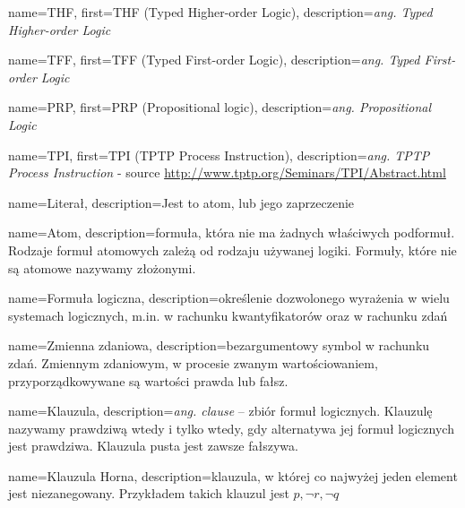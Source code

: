  {
    name=THF,
    first={THF (Typed Higher-order Logic)},
    description={\textit{ang. Typed Higher-order Logic}}
}

 {
    name=TFF,
    first={TFF (Typed First-order Logic)},
    description={\textit{ang. Typed First-order Logic}}
}

 {
    name={PRP},
    first={PRP (Propositional logic)},
    description={\textit{ang. Propositional Logic}}
}

 {
    name=TPI,
    first={TPI (TPTP Process Instruction)},
    description={\textit{ang. TPTP Process Instruction} - source \url{http://www.tptp.org/Seminars/TPI/Abstract.html}}
}

 {
    name=Literał,
    description={Jest to atom, lub jego zaprzeczenie}
}

 {
    name=Atom,
    description={formuła, która nie ma żadnych właściwych podformuł. Rodzaje formuł atomowych zależą od rodzaju używanej logiki.
    Formuły, które nie są atomowe nazywamy złożonymi. }
}

 {
    name={Formuła logiczna},
    description={określenie dozwolonego wyrażenia w wielu systemach logicznych, m.in. w rachunku kwantyfikatorów oraz w rachunku zdań}
}

 {
    name=Zmienna zdaniowa,
    description={bezargumentowy symbol w rachunku zdań. Zmiennym zdaniowym, w procesie zwanym wartościowaniem, przyporządkowywane są wartości prawda lub fałsz.}
}

 {
    name=Klauzula,
    description={\textit{ang. clause} – zbiór formuł logicznych. Klauzulę nazywamy prawdziwą wtedy i tylko wtedy, gdy alternatywa jej formuł logicznych jest prawdziwa. Klauzula pusta jest zawsze fałszywa. }
}

 {
    name=Klauzula Horna,
    description={klauzula, w której co najwyżej jeden element jest niezanegowany. Przykładem takich klauzul jest ${p,\neg r,\neg q}$ }
}

